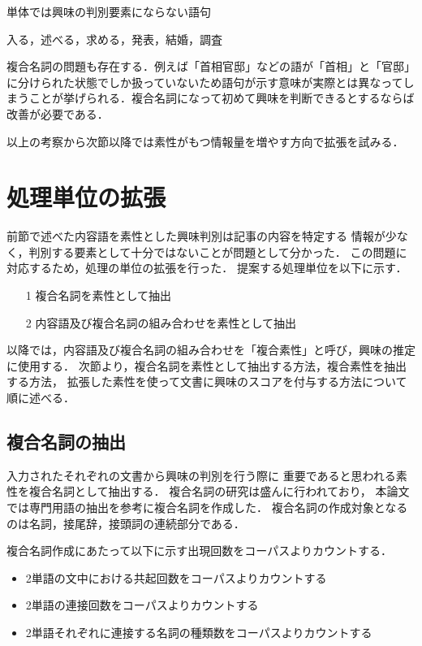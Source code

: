 \documentclass[japanese]{jnlp_1.4}
\newcounter{ex}
\def\ex#1{}
\begin{document}
\begin{itembox}
{\ex{}\label{ex_var}単体では興味の判別要素にならない語句}
\begin{center}
入る，述べる，求める，発表，結婚，調査
\end{center}
\end{itembox}

複合名詞の問題も存在する．例えば「首相官邸」などの語が「首相」と「官邸」
に分けられた状態でしか扱っていないため語句が示す意味が実際とは異なってし
まうことが挙げられる．複合名詞になって初めて興味を判断できるとするならば
改善が必要である．



以上の考察から次節以降では素性がもつ情報量を増やす方向で拡張を試みる．



\section{処理単位の拡張}\label{sec_method2}

前節で述べた内容語を素性とした興味判別は記事の内容を特定する
情報が少なく，判別する要素として十分ではないことが問題として分かった．
この問題に対応するため，処理の単位の拡張を行った．
提案する処理単位を以下に示す．
\begin{itemize}
\item[1] 複合名詞を素性として抽出
\item[2] 内容語及び複合名詞の組み合わせを素性として抽出
\end{itemize}
以降では，内容語及び複合名詞の組み合わせを「複合素性」と呼び，興味の推定に使用する．
次節より，複合名詞を素性として抽出する方法，複合素性を抽出する方法，
拡張した素性を使って文書に興味のスコアを付与する方法について順に述べる．


\subsection{複合名詞の抽出}\label{fukugou}

入力されたそれぞれの文書から興味の判別を行う際に
重要であると思われる素性を複合名詞として抽出する．
複合名詞の研究は盛んに行われており，
本論文では専門用語の抽出\cite{Nakagawa2003}を参考に複合名詞を作成した．
複合名詞の作成対象となるのは名詞，接尾辞，接頭詞の連続部分である．


複合名詞作成にあたって以下に示す出現回数をコーパスよりカウントする．
\begin{itemize}
\item 2単語の文中における共起回数をコーパスよりカウントする
\item 2単語の連接回数をコーパスよりカウントする
\item 2単語それぞれに連接する名詞の種類数をコーパスよりカウントする
\end{itemize}
\end{document}
